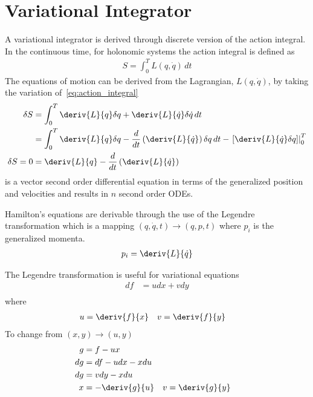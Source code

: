 \section{Variational Integrator}
A variational integrator is derived through discrete version of the action integral.
In the continuous time, for holonomic systems the action integral is defined as
\begin{align}\label{eq:action_integral}
	S = \int_{0}^T L\left( q, \dot{q}\right) \, dt
\end{align}
The equations of motion can be derived from the Lagrangian, \( L\left(q, \dot{q} \right) \), by taking the variation of~\cref{eq:action_integral}
\begin{align}\label{eq:el_eq}
	\delta S &= \int_{0}^T \deriv{L}{q} \delta q + \deriv{L}{\dot{q}} \delta \dot{q} \, dt \\
		&= \int_{0}^T \deriv{L}{q} \delta q - \frac{d}{dt} \left( \deriv{L}{\dot{q}}\right) \delta q \, dt - \left. \left[ \deriv{L}{\dot{q}} \delta q\right] \right|_0^T \\
	\delta S = 0 &= \deriv{L}{q} - \frac{d}{dt} \left( \deriv{L}{\dot{q}}	\right)
\end{align}
 is a vector second order differential equation in terms of the generalized position and velocities and results in \( n\) second order ODEs.

Hamilton's equations are derivable through the use of the Legendre transformation which is a mapping \( \left( q, \dot{q},t\right) \rightarrow \left(q, p, t \right) \) where \( p_i\) is the generalized momenta.
\begin{align}\label{eq:legendre_transform}
	p_i = \deriv{L}{\dot{q}}
\end{align}

The Legendre transformation is useful for variational equations
\begin{align*}
	df &= u dx + v dy \\
\end{align*}
where
\begin{align*}
	u &= \deriv{f}{x} & v &= \deriv{f}{y}
\end{align*}
To change from \( \left( x, y\right) \rightarrow \left(u,y \right) \)
\begin{align*}
	g &= f - u x\\
	dg &= df - u dx - x du\\
	dg &= v dy - x du \\
	x&= -\deriv{g}{u} & v&= \deriv{g}{y}
\end{align*}

